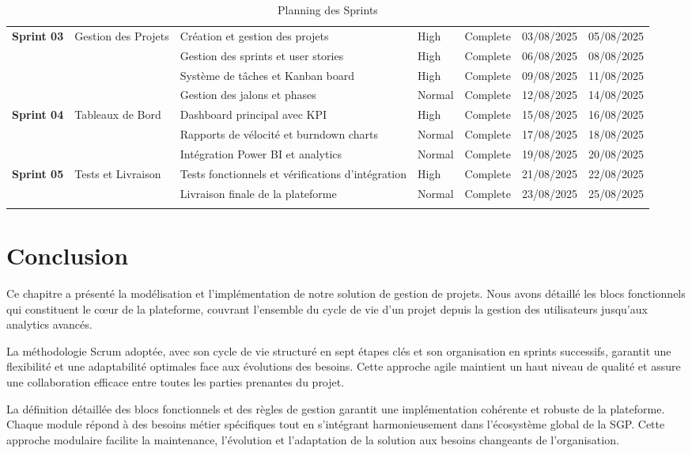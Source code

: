\begin{longtable}{|p{1.2cm}|p{2.8cm}|p{4.8cm}|p{1.2cm}|p{1.2cm}|p{1.8cm}|p{1.8cm}|}
    \multirow{4}{=}{\centering\textbf{Sprint 03}} & \multirow{4}{=}{\centering Gestion des Projets} & Création et gestion des projets & High & Complete & 03/08/2025 & 05/08/2025 \\ \cline{3-7}
    & & Gestion des sprints et user stories & High & Complete & 06/08/2025 & 08/08/2025 \\ \cline{3-7}
    & & Système de tâches et Kanban board & High & Complete & 09/08/2025 & 11/08/2025 \\ \cline{3-7}
    & & Gestion des jalons et phases & Normal & Complete & 12/08/2025 & 14/08/2025 \\ \hline

    \multirow{3}{=}{\centering\textbf{Sprint 04}} & \multirow{3}{=}{\centering Tableaux de Bord} & Dashboard principal avec KPI & High & Complete & 15/08/2025 & 16/08/2025 \\ \cline{3-7}
    & & Rapports de vélocité et burndown charts & Normal & Complete & 17/08/2025 & 18/08/2025 \\ \cline{3-7}
    & & Intégration Power BI et analytics & Normal & Complete & 19/08/2025 & 20/08/2025 \\ \hline

    \multirow{2}{=}{\centering\textbf{Sprint 05}} & \multirow{2}{=}{\centering Tests et Livraison} & Tests fonctionnels et vérifications d'intégration & High & Complete & 21/08/2025 & 22/08/2025 \\ \cline{3-7}
& & Livraison finale de la plateforme & Normal & Complete & 23/08/2025 & 25/08/2025 \\ \hline

\caption{Planning des Sprints}
\label{tab:planning_sprints}
\endlastfoot

\end{longtable}
\endgroup

\section{Conclusion}

Ce chapitre a présenté la modélisation et l'implémentation de notre solution de gestion de projets. Nous avons détaillé les blocs fonctionnels qui constituent le cœur de la plateforme, couvrant l'ensemble du cycle de vie d'un projet depuis la gestion des utilisateurs jusqu'aux analytics avancés. 

La méthodologie Scrum adoptée, avec son cycle de vie structuré en sept étapes clés et son organisation en sprints successifs, garantit une flexibilité et une adaptabilité optimales face aux évolutions des besoins. Cette approche agile maintient un haut niveau de qualité et assure une collaboration efficace entre toutes les parties prenantes du projet.

La définition détaillée des blocs fonctionnels et des règles de gestion garantit une implémentation cohérente et robuste de la plateforme. Chaque module répond à des besoins métier spécifiques tout en s'intégrant harmonieusement dans l'écosystème global de la SGP. Cette approche modulaire facilite la maintenance, l'évolution et l'adaptation de la solution aux besoins changeants de l'organisation.
